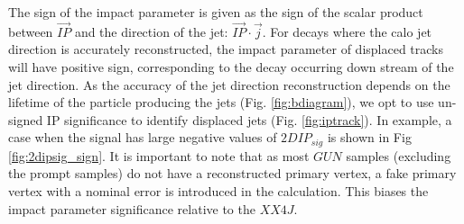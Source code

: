 The sign of the impact parameter is given as the sign of the scalar product between $\vec{IP}$ and  the direction of the jet: $\vec{IP} \cdot \vec j$. 
For decays where the calo jet direction is accurately reconstructed, the impact parameter of displaced tracks
will have positive sign, corresponding to the decay occurring down stream of the jet direction. As the accuracy of the jet direction
reconstruction depends on the lifetime of the particle producing the jets (Fig. \ref{fig:bdiagram}), we opt to use un-signed IP significance to 
identify displaced jets (Fig. \ref{fig:iptrack}). In example, a case when the signal has large negative values of $2DIP_{sig}$ is shown in Fig \ref{fig:2dipsig_sign}.
 It is important to note that as most $GUN$ samples (excluding the prompt samples) do not 
have a reconstructed primary vertex, a fake primary vertex with a nominal error is introduced in the calculation. 
This biases the impact parameter significance relative to the $XX4J$.

